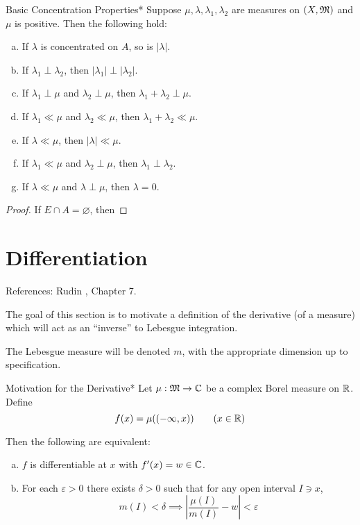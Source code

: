\begin{proposition}{Basic Concentration Properties}*
    Suppose \(\mu, \lambda, \lambda_1, \lambda_2\) are measures on \((X, \mathfrak{M})\) and \(\mu\) is positive. Then the following hold:
    \begin{enumerate}[(a)]
        \itemsep0em
        \item If \(\lambda\) is concentrated on \(A\), so is \(|\lambda|\). 
        \item If \(\lambda_1 \perp \lambda_2\), then \(|\lambda_1| \perp |\lambda_2|\). 
        \item If \(\lambda_1 \perp \mu\) and \(\lambda_2 \perp \mu\), then \(\lambda_1 + \lambda_2 \perp \mu\).
        \item If \(\lambda_1 \ll \mu\) and \(\lambda_2 \ll \mu\), then \(\lambda_1 + \lambda_2 \ll \mu\).
        \item If \(\lambda \ll \mu\), then \(|\lambda| \ll \mu\).
        \item If \(\lambda_1 \ll \mu\) and \(\lambda_2 \perp \mu\), then \(\lambda_1 \perp \lambda_2\). 
        \item If \(\lambda \ll \mu\) and \(\lambda \perp \mu\), then \(\lambda = 0\). 
    \end{enumerate}
\end{proposition}

\begin{proof}
     If \(E \cap A = \varnothing\), then
\end{proof}





\newpage
\section{Differentiation}

References: Rudin , Chapter 7. 
\stdvspace

 The goal of this section is to motivate a definition of the derivative (of a measure) which will act as an “inverse” to Lebesgue integration.
\stdvspace

 The Lebesgue measure will be denoted \(m\), with the appropriate dimension up to specification. 

\begin{theorem}{Motivation for the Derivative}*
    Let \(\mu : \mathfrak{M} \to \mathbb{C}\) be a complex Borel measure on \(\mathbb{R}\). Define 
    \[
        f(x) = \mu((-\infty, x)) 
        \qquad (x \in \mathbb{R})
    \]

    Then the following are equivalent: 
    \begin{enumerate}[(a)]
        \item \(f\) is differentiable at \(x\) with \(f'(x) = w \in \mathbb{C}\). 
        \item For each \(\varepsilon > 0\) there exists \(\delta > 0\) such that for any open interval \(I \ni x\), 
        \[
            m(I) < \delta 
            \implies
            \left| \frac{\mu(I)}{m(I)} - w \right| < \varepsilon
        \]
    \end{enumerate}
\end{theorem}


